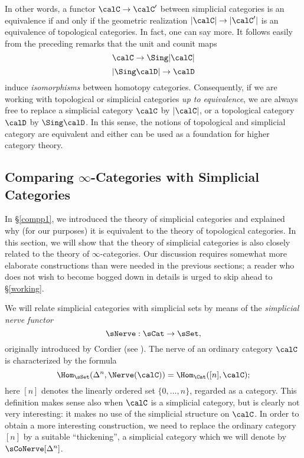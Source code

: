 In other words, a functor $\calC \rightarrow \calC'$ between simplicial categories is an equivalence if and only if the geometric realization $|\calC| \rightarrow |\calC'|$ is an equivalence of topological categories. In fact, one can say more. It follows easily from the preceding remarks that the unit and counit maps
$$ \calC \rightarrow \Sing | \calC |$$
$$ | \Sing \calD | \rightarrow \calD$$
induce {\em isomorphisms} between homotopy categories. Consequently, if we are working with topological or simplicial categories {\it up to equivalence}, we are always free to replace a simplicial category $\calC$ by $|\calC|$, or a topological category $\calD$ by $\Sing \calD$. In this sense, the notions of topological and simplicial category are equivalent and either can be used as a foundation for higher category theory.

\subsection{Comparing $\infty$-Categories with Simplicial Categories}\label{theequiv}

In \S \ref{compp1}, we introduced the theory of simplicial categories and explained why (for our purposes) it is equivalent to the theory of topological categories. In this section, we will show that the theory of simplicial categories is also closely related to the theory of $\infty$-categories.
Our discussion requires somewhat more elaborate constructions than were needed in the previous sections; a reader who does not wish to become bogged down in details is urged to skip ahead to \S \ref{working}.

We will relate simplicial categories with simplicial sets by means of the {\it simplicial nerve functor}
$$ \sNerve: \sCat \rightarrow \sSet,$$
originally introduced by Cordier (see \cite{coherentnerve}).
The nerve of an ordinary category $\calC$ is characterized by the formula
$$ \Hom_{ \sSet}( \Delta^n, \Nerve(\calC)) = \Hom_{\Cat}( [n], \calC );$$
here $[n]$ denotes the linearly ordered set $\{ 0, \ldots, n\}$, regarded
as a category. This
definition makes sense also when $\calC$ is a simplicial
category, but is clearly not very interesting: it makes no use of
the simplicial structure on $\calC$. In order to obtain a more interesting construction,
we need to replace the ordinary category $[n]$ by a suitable ``thickening'', a simplicial
category which we will denote by $\sCoNerve[\Delta^n]$.

